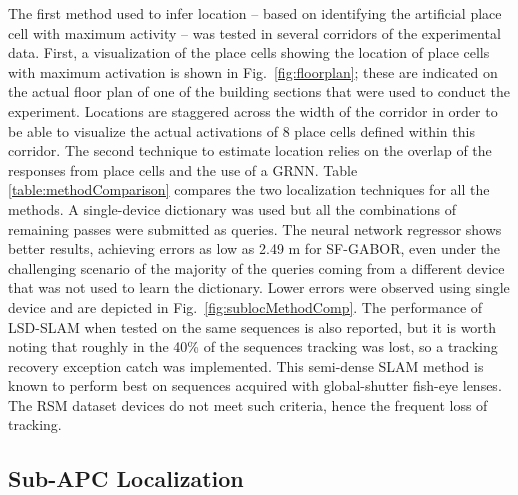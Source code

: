 The first method used to infer location -- based on identifying the artificial place cell with maximum activity -- was tested in several corridors of the experimental data.  First, a visualization of the place cells showing the location of place cells with maximum activation is shown in Fig.~\ref{fig:floorplan}; these are indicated on the actual floor plan of one of the building sections that were used to conduct the experiment.  Locations are staggered across the width of the corridor in order to be able to visualize the actual activations of 8 place cells defined within this corridor. The second technique to estimate location relies on the overlap of the responses from place cells and the use of a GRNN. Table \ref{table:methodComparison} compares the two localization techniques for all the methods. A single-device dictionary was used but all the combinations of remaining passes were submitted as queries. The neural network regressor shows better results, achieving errors as low as 2.49 m for SF-GABOR, even under the challenging scenario of the majority of the queries coming from a different device that was not used to learn the dictionary. Lower errors were observed using single device and are depicted in Fig.~\ref{fig:sublocMethodComp}. The performance of LSD-SLAM when tested on the same sequences is also reported, but it is worth noting that roughly in the 40\% of the sequences tracking was lost, so a tracking recovery exception catch was implemented. This  semi-dense SLAM method is known to perform best on sequences acquired with global-shutter fish-eye lenses. The RSM dataset devices do not meet such criteria, hence the frequent loss of tracking.







\subsection{Sub-APC Localization}


